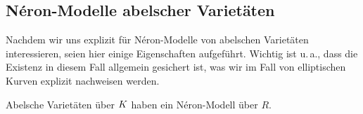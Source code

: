 \documentclass[german, bibliography=totoc]{scrreprt}
\begin{document}
\subsection{Néron-Modelle abelscher Varietäten}
Nachdem wir uns explizit für Néron-Modelle von abelschen Varietäten
interessieren, seien hier einige Eigenschaften aufgeführt.
Wichtig ist u.\,a., dass die Existenz in diesem Fall allgemein
gesichert ist, was wir im Fall von elliptischen Kurven explizit
nachweisen werden.
\begin{Satz}\label{thm:exneronmodellabvarietaet}
  Abelsche Varietäten über $K$ haben ein Néron-Modell über $R$.
\end{Satz}

\end{document}

